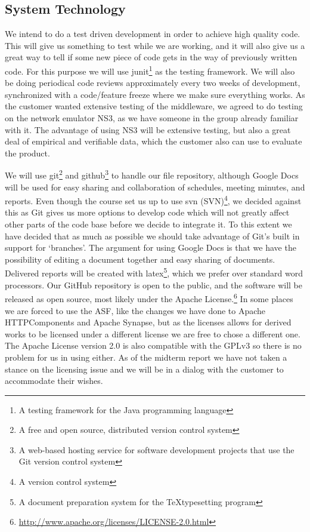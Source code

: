     \subsection{System Technology}\label{System Technology}
    
    We  intend to do a test driven development in order to achieve high quality code. This will give us something to test while we are working, and it will also give us a great way to tell if some new piece of code gets in the way of previously written code. For this purpose we will use \gls{junit}\footnote{A testing framework for the Java programming language} as the testing framework. We will also be doing periodical code reviews approximately every two weeks of development, synchronized with a code/feature freeze where we make sure everything works. As the customer wanted extensive testing of the middleware, we agreed to do testing on the network emulator NS3, as we have someone in the group already familiar with it. The advantage of using NS3 will be extensive testing, but also a great deal of empirical and verifiable data, which the customer also can use to evaluate the product.

    We will use \gls{git}\footnote{A free and open source, distributed version control system} and \gls{github}\footnote{A web-based hosting service for software development projects that use the Git version control system} to handle our file repository, although Google Docs will be used for easy sharing and collaboration of schedules, meeting minutes, and reports. Even though the course set us up to use \gls{svn} (SVN)\footnote{A version control system}, we decided against this as Git gives us more options to develop code which will not greatly affect other parts of the code base before we decide to integrate it. To this extent we have decided that as much as possible we should take advantage of Git’s built in support for ‘branches’. The argument for using Google Docs is that we have the possibility of editing a document together and easy sharing of documents. Delivered reports will be created with \gls{latex}\footnote{A document preparation system for the \TeX typesetting program}, which we prefer over standard word processors. Our GitHub repository is open to the public, and the software will be released as open source, most likely under the Apache License.\footnote{\url{http://www.apache.org/licenses/LICENSE-2.0.html}} In some places we are forced to use the ASF, like the changes we have done to Apache HTTPComponents and Apache Synapse, but as the licenses allows for derived works to be licensed under a different license we are free to chose a different one. The Apache License version 2.0 is also compatible with the GPLv3 so there is no problem for us in using either. As of the midterm report we have not taken a stance on the licensing issue and we will be in a dialog with the customer to accommodate their wishes.

